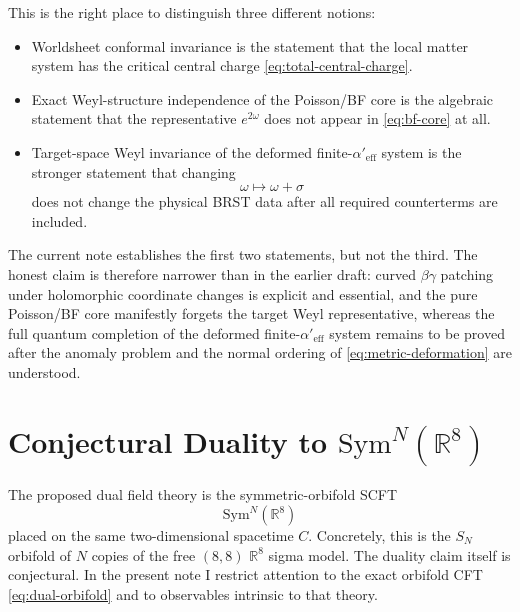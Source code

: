 \documentclass[11pt]{article}
\newcommand{\Aeff}{\alpha'_{\mathrm{eff}}}
\newcommand{\Sym}{\mathrm{Sym}}
\newcommand{\bR}{\mathbb{R}}
\begin{document}
This is the right place to distinguish three different notions:
\begin{itemize}
\item Worldsheet conformal invariance is the statement that the local matter system has the critical central charge \eqref{eq:total-central-charge}.
\item Exact Weyl-structure independence of the Poisson/BF core is the algebraic statement that the representative $e^{2\omega}$ does not appear in \eqref{eq:bf-core} at all.
\item Target-space Weyl invariance of the deformed finite-$\Aeff$ system is the stronger statement that changing
\begin{equation}\label{eq:target-weyl-rescaling}
\omega\longmapsto \omega+\sigma
\end{equation}
does not change the physical BRST data after all required counterterms are included.
\end{itemize}
The current note establishes the first two statements, but not the third. The honest claim is therefore narrower than in the earlier draft: curved $\beta\gamma$ patching under holomorphic coordinate changes is explicit and essential, and the pure Poisson/BF core manifestly forgets the target Weyl representative, whereas the full quantum completion of the deformed finite-$\Aeff$ system remains to be proved after the anomaly problem and the normal ordering of \eqref{eq:metric-deformation} are understood.

\section[Conjectural Duality to SymN(R8)]{Conjectural Duality to $\Sym^N(\bR^8)$}
The proposed dual field theory is the symmetric-orbifold SCFT
\begin{equation}\label{eq:dual-orbifold}
\Sym^N(\bR^8)
\end{equation}
placed on the same two-dimensional spacetime $C$. Concretely, this is the $S_N$ orbifold of $N$ copies of the free $(8,8)$ $\bR^8$ sigma model. The duality claim itself is conjectural. In the present note I restrict attention to the exact orbifold CFT \eqref{eq:dual-orbifold} and to observables intrinsic to that theory.
\end{document}
